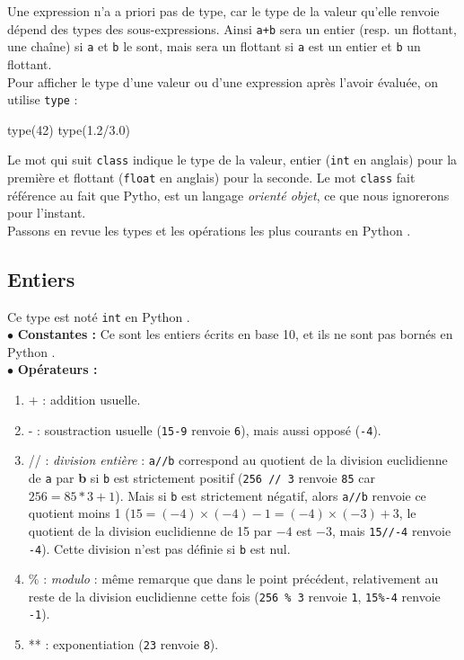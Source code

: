 Une expression n'a a priori pas de type, car le type de la valeur qu'elle renvoie dépend des types 
des sous-expressions. Ainsi \texttt{a+b} sera un entier (resp. un flottant, une chaîne) si 
\texttt{a} et \texttt{b} le sont, mais sera un flottant si \texttt{a} est un entier et \texttt{b} 
un flottant.\\

Pour afficher le type d'une valeur ou d'une expression après l'avoir évaluée, on utilise 
\texttt{type} :\\
\begin{pyconsole}
type(42)
type(1.2/3.0)
\end{pyconsole}
Le mot qui suit \texttt{class} indique le type de la valeur, entier (\texttt{int} en anglais) pour 
la première et flottant (\texttt{float} en anglais) pour la seconde. Le mot \texttt{class} fait 
référence au fait que Pytho, est un langage \emph{orienté objet}, ce que nous ignorerons pour 
l'instant.\\

Passons en revue les types et les opérations les plus courants en Python .

\subsection{Entiers}

Ce type est noté \texttt{int} en Python .\\

\noindent$\bullet$ \textbf{Constantes :} Ce sont les entiers écrits en base 10, et ils ne sont pas 
bornés en Python .\\

\noindent$\bullet$ \textbf{Opérateurs :}
\begin{enumerate}
 \item + : addition usuelle.
 \item - : soustraction usuelle (\texttt{15-9} renvoie \texttt{6}), mais aussi opposé 
(\texttt{-4}). 
\item  // : \emph{division entière} : \texttt{a//b} correspond au quotient de la 
division euclidienne de \texttt{a} par \textbf{b} si \texttt{b} est strictement positif 
(\texttt{256 // 3} renvoie \texttt{85} car $256 = 85*3 + 1$). Mais si \texttt{b} est strictement 
négatif, alors \texttt{a//b} renvoie ce quotient moins 1 ($15 = (-4)\times(-4)-1=(-4)\times(-3)+3$, 
le quotient de la division euclidienne de 15 par $-4$ est $-3$, mais \texttt{15//-4} renvoie 
\texttt{-4}). Cette division n'est pas définie si \texttt{b} est nul.
\item $\%$ : \emph{modulo} : même remarque que dans le point précédent, relativement au reste de la 
division euclidienne cette fois (\texttt{256 \% 3} renvoie 
\texttt{1}, \texttt{15\%-4} renvoie \texttt{-1}).
\item ** : exponentiation (\texttt{2\raisebox{0.3ex}{**}3} renvoie \texttt{8}).
\end{enumerate}

